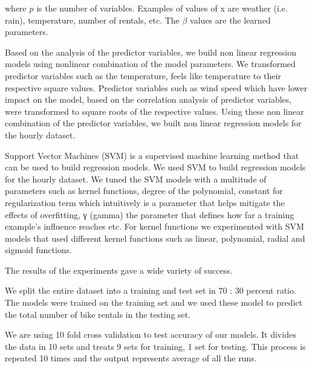 \documentclass[12pt]{article}
\begin{document}
where $p$ is the number of variables. Examples of values of x are weather
(i.e. rain), temperature, number of rentals, etc. The $\beta$ values are the
learned parameters.



Based on the analysis of the predictor variables, we build non linear
regression models using nonlinear combination of the model parameters. We
transformed predictor variables such as the temperature, feels like temperature
to their respective square values. Predictor variables such as wind speed which
have lower impact on the model, based on the correlation analysis of predictor
variables, were transformed to square roots of the respective values.  Using
these non linear combination of the predictor variables, we built non linear
regression models for the hourly dataset.



Support Vector Machines (SVM) is a supervised machine learning method that can
be used to build regression models.  We used SVM to build regression models for
the hourly dataset. We tuned the SVM models with a multitude of parameters such
as kernel functions, degree of the polynomial, constant for regularization term
which intuitively is a parameter that helps mitigate the effects of
overfitting, γ (gamma) the parameter that defines how far a training example's
influence reaches etc. For kernel functions we experimented with SVM models
that used different kernel functions such as linear, polynomial, radial and
sigmoid functions.

		



The results of the experiments gave a wide variety of success.


We split the entire dataset into a training and test set in 70 : 30 percent
ratio. The models were trained on the training set and we used these model to
predict the total number of bike rentals in the testing set.


We are using 10 fold cross validation to test accuracy of our models. It
divides the data in 10 sets and treats 9 sets for training, 1 set for
testing. This process is repeated 10 times and the output represents average of
all the runs.
\end{document}
